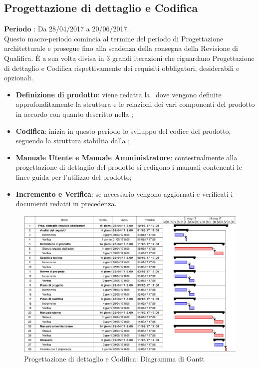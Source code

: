 \documentclass[../PianoDiProgetto.tex]{subfiles}
\begin{document}
		\subsection{Progettazione di dettaglio e Codifica}
		\textbf{Periodo} : Da 28/04/2017 a 20/06/2017. \\
		Questo macro-periodo comincia al termine del periodo di Progettazione architetturale e prosegue fino alla scadenza della consegna della Revisione di Qualifica.
		È a sua volta divisa in 3 grandi iterazioni che riguardano Progettazione di dettaglio e Codifica rispettivamente dei requisiti obbligatori, desiderabili e opzionali.
		\begin{itemize}
			\item \textbf{Definizione di prodotto}: viene redatta la \ dove vengono definite approfonditamente la struttura e le relazioni dei vari componenti del prodotto in accordo con quanto descritto nella \specificatecnica ;
			\item \textbf{Codifica}: inizia in questo periodo lo sviluppo del codice del prodotto, seguendo la struttura stabilita dalla  ;
			\item \textbf{Manuale Utente e Manuale Amministratore}: contestualmente alla progettazione di dettaglio del prodotto si redigono i manuali contenenti le linee guida per l'utilizzo del prodotto; 
			\item \textbf{Incremento e Verifica}: se necessario vengono aggiornati e verificati i documenti redatti in precedenza.
		\end{itemize}
		\begin{figure}[H]
			\centering
			\includegraphics[scale=0.55]{Figures/Gantt_DettaglioObbligatori}
			\caption{Progettazione di dettaglio e Codifica: Diagramma di Gantt}
		\end{figure}
\end{document}
